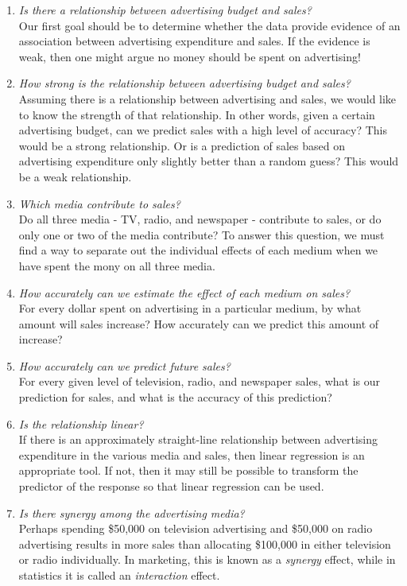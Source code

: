 \documentclass[
]{book}
\begin{document}
\begin{enumerate}
\def\labelenumi{\arabic{enumi}.}
\item
  \emph{Is there a relationship between advertising budget and sales?}\\
  Our first goal should be to determine whether the data provide evidence of an association between advertising expenditure and sales.
  If the evidence is weak, then one might argue no money should be spent on advertising!
\item
  \emph{How strong is the relationship between advertising budget and sales?}\\
  Assuming there is a relationship between advertising and sales, we would like to know the strength of that relationship.
  In other words, given a certain advertising budget, can we predict sales with a high level of accuracy?
  This would be a strong relationship.
  Or is a prediction of sales based on advertising expenditure only slightly better than a random guess?
  This would be a weak relationship.
\item
  \emph{Which media contribute to sales?}\\
  Do all three media - TV, radio, and newspaper - contribute to sales, or do only one or two of the media contribute?
  To answer this question, we must find a way to separate out the individual effects of each medium when we have spent the mony on all three media.
\item
  \emph{How accurately can we estimate the effect of each medium on sales?}\\
  For every dollar spent on advertising in a particular medium, by what amount will sales increase?
  How accurately can we predict this amount of increase?
\item
  \emph{How accurately can we predict future sales?}\\
  For every given level of television, radio, and newspaper sales, what is our prediction for sales, and what is the accuracy of this prediction?
\item
  \emph{Is the relationship linear?}\\
  If there is an approximately straight-line relationship between advertising expenditure in the various media and sales, then linear regression is an appropriate tool.
  If not, then it may still be possible to transform the predictor of the response so that linear regression can be used.
\item
  \emph{Is there synergy among the advertising media?}\\
  Perhaps spending \$50,000 on television advertising and \$50,000 on radio advertising results in more sales than allocating \$100,000 in either television or radio individually.
  In marketing, this is known as a \emph{synergy} effect, while in statistics it is called an \emph{interaction} effect.
\end{enumerate}
\end{document}
